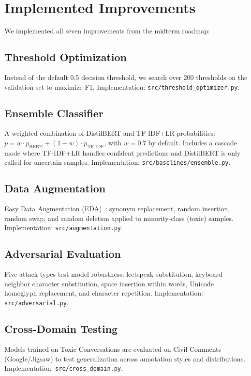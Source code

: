 \documentclass[11pt,a4paper]{article}
\begin{document}
\section{Implemented Improvements}

We implemented all seven improvements from the midterm roadmap:

\subsection{Threshold Optimization}
Instead of the default 0.5 decision threshold, we search over 200 thresholds on the validation set to maximize F1.
Implementation: \texttt{src/threshold\_optimizer.py}.

\subsection{Ensemble Classifier}
A weighted combination of DistilBERT and TF-IDF+LR probabilities: $p = w \cdot p_{\text{BERT}} + (1-w) \cdot p_{\text{TF-IDF}}$, with $w=0.7$ by default.
Includes a cascade mode where TF-IDF+LR handles confident predictions and DistilBERT is only called for uncertain samples.
Implementation: \texttt{src/baselines/ensemble.py}.

\subsection{Data Augmentation}
Easy Data Augmentation (EDA)~\cite{wei2019eda}: synonym replacement, random insertion, random swap, and random deletion applied to minority-class (toxic) samples.
Implementation: \texttt{src/augmentation.py}.

\subsection{Adversarial Evaluation}
Five attack types test model robustness: leetspeak substitution, keyboard-neighbor character substitution, space insertion within words, Unicode homoglyph replacement, and character repetition.
Implementation: \texttt{src/adversarial.py}.

\subsection{Cross-Domain Testing}
Models trained on Toxic Conversations are evaluated on Civil Comments (Google/Jigsaw) to test generalization across annotation styles and distributions.
Implementation: \texttt{src/cross\_domain.py}.
\end{document}
